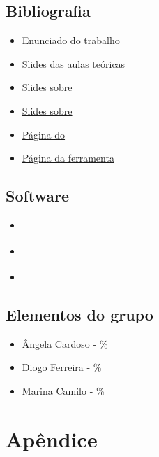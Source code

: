 \documentclass[12pt]{report}
\begin{document}
\section{Bibliografia}

\begin{itemize}
	\item \href{https://paginas.fe.up.pt/~eol/AIAD/1617/trabalhos.html#T05}{Enunciado do trabalho}
	\item \href{https://paginas.fe.up.pt/~eol/AIAD/aiad1617.html}{Slides das aulas teóricas}
	\item \href{https://paginas.fe.up.pt/~eol/AIAD/aulas/jade_en.pdf}{Slides sobre \jade}
	\item \href{https://paginas.fe.up.pt/~eol/AIAD/aulas/REPAST_intro_hlc.pdf}{Slides sobre \repast}
	\item \href{https://web.fe.up.pt/~hlc/doku.php?id=sajas}{Página do \sajas}
	\item \href{https://web.fe.up.pt/~hlc/doku.php?id=massim2dev}{Página da ferramenta \massim}
\end{itemize}

\section{Software}

\begin{itemize}
	\item \href{http://jade.tilab.com}{\jade}
	\item \href{http://repast.sourceforge.net/repast_3/index.html}{\repast}
	\item \href{https://web.fe.up.pt/~hlc/doku.php?id=sajas}{\sajas}
\end{itemize}

\section{Elementos do grupo}
\begin{itemize}
	\item Ângela Cardoso - \%
	\item Diogo Ferreira - \%
	\item Marina Camilo - \%
\end{itemize}


\chapter{Apêndice}

\end{document}
